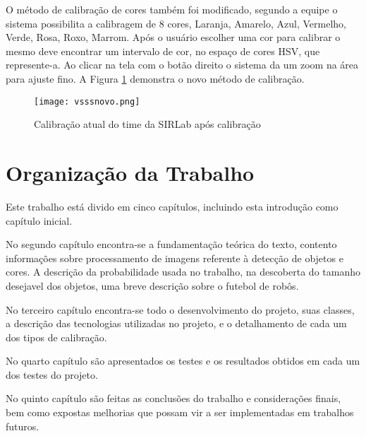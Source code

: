 O método de calibração de cores também foi modificado, segundo a equipe\cite{VSSVision} o sistema possibilita a calibragem de 8 cores, Laranja, Amarelo, Azul, Vermelho, Verde, Rosa, Roxo, Marrom. Após o usuário escolher uma cor para calibrar o mesmo deve encontrar um intervalo de cor, no espaço de cores HSV, que represente-a. Ao clicar na tela com o botão direito o sistema da um zoom na área para ajuste fino. A Figura \ref{SIRLabNovaCalibracao} demonstra o novo método de calibração.

\begin{figure}[!h]
	\centering
	\texttt{[image: vsssnovo.png]} 	
	\caption{Calibração atual do time da SIRLab \cite{VSSVision} após calibração}
	\label{SIRLabNovaCalibracao}
\end{figure}

\newpage
\section{Organização da Trabalho} \label{Sec:Organizacao}

Este trabalho está divido em cinco capítulos, incluindo esta introdução como capítulo inicial.

No segundo capítulo encontra-se a fundamentação teórica do texto, contento informaç\~oes sobre processamento de imagens referente à detecção de objetos e cores. A descrição da probabilidade usada no trabalho, na descoberta do tamanho desejavel dos objetos, uma breve descrição sobre o futebol de robôs. 

No terceiro capítulo encontra-se todo o desenvolvimento do projeto, suas classes, a descrição das tecnologias utilizadas no projeto, e o detalhamento de cada um dos tipos de calibração.

No quarto capítulo são apresentados os testes e os resultados obtidos em cada um dos testes do projeto.

No quinto capítulo são feitas as conclusões do trabalho e considerações finais, bem como expostas melhorias que possam vir a ser implementadas em trabalhos futuros.